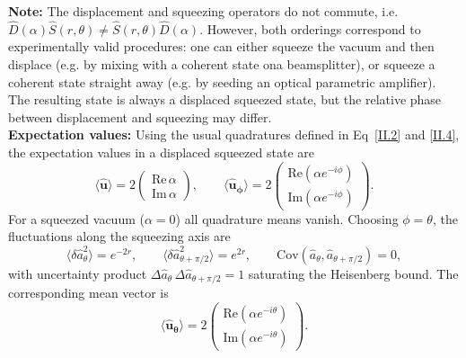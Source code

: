 \noindent \textbf{Note:}  The displacement and squeezing operators do not commute, i.e. $\hat{D}(\alpha)\hat{S}(r, \theta) \neq \hat{S}(r, \theta)\hat{D}(\alpha)$. However, both orderings correspond to experimentally valid procedures: one can either squeeze the vacuum and then displace (e.g. by mixing with a coherent state ona beamsplitter), or squeeze a coherent state straight away (e.g. by seeding an optical parametric amplifier). The resulting state is always a displaced squeezed state, but the relative phase between displacement and squeezing may differ. \\

\noindent \textbf{Expectation values: }Using the usual quadratures defined in Eq~\eqref{II.2} and \eqref{II.4}, the expectation values in a displaced squeezed state are
\begin{equation}
\langle \mathbf{\hat{u}} \rangle
= 2
\begin{pmatrix}
\mathrm{Re}\,\alpha \\[2pt]
\mathrm{Im}\,\alpha
\end{pmatrix}, 
\qquad
\langle \mathbf{\hat{u}_\phi} \rangle
= 2
\begin{pmatrix}
\mathrm{Re}\!\left(\alpha e^{-i\phi}\right) \\[2pt]
\mathrm{Im}\!\left(\alpha e^{-i\phi}\right)
\end{pmatrix}.
\label{II.xx3}
\end{equation}
For a squeezed vacuum ($\alpha=0$) all quadrature means vanish.
Choosing $\phi = \theta$, the fluctuations along the squeezing axis are
\begin{equation}
\langle \delta \hat a_\theta^2  \rangle = e^{-2r}, \qquad
\langle \delta \hat a_{\theta+\pi/2}^2 \rangle = e^{2r}, \qquad
\mathrm{Cov}(\hat a_\theta, \hat a_{\theta+\pi/2}) = 0,
\end{equation}
with uncertainty product $\Delta \hat a_\theta\, \Delta \hat a_{\theta+\pi/2} = 1$ saturating the Heisenberg bound.
The corresponding mean vector is
\begin{equation}
\langle \mathbf{\hat{u}_\theta} \rangle
= 2
\begin{pmatrix}
\mathrm{Re}(\alpha e^{-i\theta}) \\[2pt]
\mathrm{Im}(\alpha e^{-i\theta})
\end{pmatrix}.
\label{II.xx7}
\end{equation}

